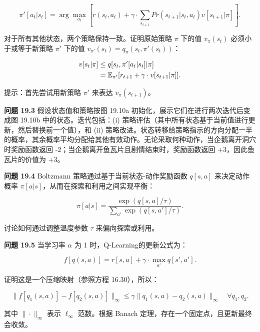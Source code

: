 \documentclass[lang=cn,newtx,10pt,scheme=chinese]{elegantbook}
\begin{document}
\begin{equation}
\pi'[a_t|s_t] = \arg\max_{a_t} \left[ r(s_t, a_t) + \gamma \cdot \sum_{s_{t+1}} Pr(s_{t+1} | s_t, a_t)v[s_{t+1} | \pi] \right]. 
\end{equation}

对于所有其他状态，两个策略保持一致。证明原始策略 \(\pi\) 下的值 \(v_{\pi}(s_t)\) 必须小于或等于新策略 \(\pi'\) 下的值 \(v_{\pi'}(s_t) = q_{\pi}(s_t, \pi'(s_t))\)：


\begin{align}
v[s_t | \pi] &\leq q[s_t, \pi'[a_t|s_t] | \pi] \notag\\
&= \mathbb{E}_{\pi'}[r_{t+1} + \gamma \cdot v[s_{t+1} | \pi]]. 
\end{align} 


提示：首先尝试用新策略 \(\pi'\) 来表达 \(v_{\pi}(s_{t+1})\)。

\textbf{问题 19.3} 假设状态值和策略按图 19.10a 初始化，展示它们在进行两次迭代后变成图 19.10b 中的状态。迭代包括：(i) 策略评估（其中所有状态基于当前值进行更新，然后替换前一个值），和 (ii) 策略改进。状态转移给策略指示的方向分配一半的概率，其余概率平均分配给其他有效动作。无论采取何种动作，当企鹅离开洞穴时奖励函数返回 -2；当企鹅离开鱼瓦片且剧情结束时，奖励函数返回 +3，因此鱼瓦片的价值为 +3。

\textbf{问题 19.4} Boltzmann 策略通过基于当前状态-动作奖励函数 \(q[s, a]\) 来决定动作概率 \(\pi[a|s]\)，从而在探索和利用之间实现平衡：

\begin{equation}
\pi[a|s] = \frac{\exp(q[s, a]/\tau)}{\sum_{a'} \exp(q[s, a']/\tau)}. 
\end{equation}

讨论如何通过调整温度参数 \(\tau\) 来偏向探索或利用。

\textbf{问题 19.5} 当学习率 \(\alpha\) 为 1 时，Q-Learning的更新公式为：

\begin{equation}
f[q(s, a)] = r[s, a] + \gamma \cdot \max_{a'} q[s', a']. 
\end{equation}

证明这是一个压缩映射（参照方程 16.30），所以：

\begin{equation}
\| f[q_1(s, a)] - f[q_2(s, a)] \|_{\infty} \leq \gamma \| q_1(s, a) - q_2(s, a) \|_{\infty} \quad \forall q_1, q_2. 
\end{equation}

其中 \(\| \cdot \|_{\infty}\) 表示 \(\ell_{\infty}\) 范数。根据 Banach 定理，存在一个固定点，且更新最终会收敛。
\end{document}

